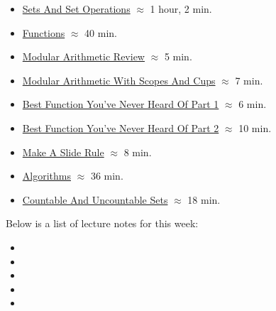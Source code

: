 \begin{itemize}
    \item \href{https://applied.cs.colorado.edu/mod/hvp/view.php?id=51609}{Sets And Set Operations} $\approx$ 1 hour, 2 min.
    \item \href{https://applied.cs.colorado.edu/mod/hvp/view.php?id=51610}{Functions} $\approx$ 40 min.
    \item \href{https://applied.cs.colorado.edu/mod/hvp/view.php?id=51611}{Modular Arithmetic Review} $\approx$ 5 min.
    \item \href{https://drive.explaineverything.com/thecode/HXKUAZT}{Modular Arithmetic With Scopes And Cups} $\approx$ 7 min.
    \item \href{https://o365coloradoedu-my.sharepoint.com/personal/stadee_colorado_edu/_layouts/15/stream.aspx?id=%2Fpersonal%2Fstadee%5Fcolorado%5Fedu%2FDocuments%2FG%2FAAAPostbac%2FBest%20function%20part1%2Emp4&ga=1}{Best Function You've Never Heard Of Part 1} $\approx$ 6 min.
    \item \href{https://o365coloradoedu-my.sharepoint.com/personal/stadee_colorado_edu/_layouts/15/stream.aspx?id=%2Fpersonal%2Fstadee%5Fcolorado%5Fedu%2FDocuments%2FG%2FAAAPostbac%2FBestfunctionyouneverheardofpart2%2Emp4&ga=1}{Best Function You've Never Heard Of Part 2} $\approx$ 10 min.
    \item \href{https://o365coloradoedu-my.sharepoint.com/personal/stadee_colorado_edu/_layouts/15/stream.aspx?id=%2Fpersonal%2Fstadee%5Fcolorado%5Fedu%2FDocuments%2FG%2FAAAPostbac%2FMakeasliderule%2Emp4&ga=1}{Make A Slide Rule} $\approx$ 8 min.
    \item \href{https://applied.cs.colorado.edu/mod/hvp/view.php?id=51616}{Algorithms} $\approx$ 36 min.
    \item \href{https://applied.cs.colorado.edu/mod/hvp/view.php?id=51617}{Countable And Uncountable Sets} $\approx$ 18 min.
\end{itemize}

\noindent Below is a list of lecture notes for this week:

\begin{itemize}
    \item {}
    \item {}
    \item {}
    \item {}
    \item {}
\end{itemize}

